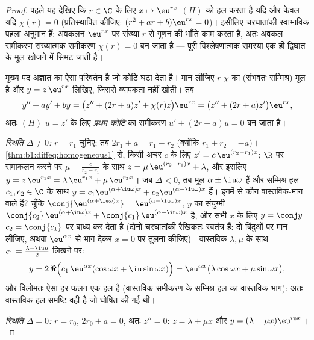 \begin{proof}
पहले यह देखिए कि $r \in \C$ के लिए $x \mapsto \eu^{rx}$ $(H)$ को हल करता है
यदि और केवल यदि $\chi(r) = 0$ (प्रतिस्थापित कीजिए: $(r^2 + ar + b)\eu^{rx} =
0$)। इसीलिए चरघातांकी स्वाभाविक पहला अनुमान हैं: अवकलन $\eu^{rx}$ पर संख्या
$r$ से गुणन की भाँति काम करता है, अतः अवकल समीकरण संख्यात्मक समीकरण $\chi(r)
= 0$ बन जाता है --- पूरी विश्लेषणात्मक समस्या एक ही द्विघात के मूल खोजने में
सिमट जाती है।

मुख्य पद अज्ञात का ऐसा परिवर्तन है जो कोटि घटा देता है। मान लीजिए $r$ $\chi$
का (संभवतः सम्मिश्र) मूल है और $y = z\, \eu^{rx}$ लिखिए, जिससे व्यापकता नहीं
खोती। तब
\[
y'' + ay' + by
= \bigl(z'' + (2r + a) z' + \chi(r) z\bigr)\eu^{rx}
= \bigl(z'' + (2r + a) z'\bigr)\eu^{rx},
\]
अतः $(H)$ $u = z'$ के लिए \emph{प्रथम कोटि} का समीकरण $u' + (2r + a) u = 0$
बन जाता है।

\emph{स्थिति $\Delta \neq 0$:} $r = r_1$ चुनिए; तब $2r_1 + a = r_1 - r_2$
(क्योंकि $r_1 + r_2 = -a$)। \cref{thm:b1:diffeq:homogeneous1} से, किसी अचर
$c$ के लिए $z' = c\,\eu^{(r_2 - r_1)x}$; $\R$ पर समाकलन करने पर $\mu =
\frac{c}{r_2 - r_1}$ के साथ $z = \mu\, \eu^{(r_2 - r_1)x} + \lambda$, और
इसलिए $y = z\, \eu^{r_1 x} = \lambda\,\eu^{r_1x} + \mu\,\eu^{r_2x}$। जब
$\Delta < 0$, तब मूल $\alpha \pm \iu\omega$ हैं और सम्मिश्र हल $c_1, c_2 \in
\C$ के साथ $y = c_1\eu^{(\alpha+\iu\omega)x} + c_2\eu^{(\alpha-\iu\omega)x}$
हैं। इनमें से कौन वास्तविक-मान वाले हैं? चूँकि
$\conj{\eu^{(\alpha+\iu\omega)x}} = \eu^{(\alpha-\iu\omega)x}$, $y$ का
संयुग्मी $\conj{c_2}\, \eu^{(\alpha+\iu\omega)x} +
\conj{c_1}\,\eu^{(\alpha-\iu\omega)x}$ है, और सभी $x$ के लिए $y = \conj y$
$c_2 = \conj{c_1}$ पर बाध्य कर देता है (दोनों चरघातांकी रैखिकतः स्वतंत्र
हैं: दो बिंदुओं पर मान लीजिए, अथवा $\eu^{\alpha x}$ से भाग देकर $x=0$ पर
तुलना कीजिए)। वास्तविक $\lambda, \mu$ के साथ $c_1 = \frac{\lambda -
\iu\mu}2$ लिखने पर:
\[
y = 2\,\Re\Bigl(c_1\,\eu^{\alpha x}(\cos\omega x +
\iu\sin\omega x)\Bigr)
= \eu^{\alpha x}\bigl(\lambda\cos\omega x + \mu\sin\omega
x\bigr),
\]
और विलोमतः ऐसा हर फलन एक हल है (वास्तविक समीकरण के सम्मिश्र हल का वास्तविक
भाग): अतः वास्तविक हल-समष्टि वही है जो घोषित की गई थी।

\emph{स्थिति $\Delta = 0$:} $r = r_0$, $2r_0 + a = 0$, अतः $z'' = 0$: $z =
\lambda + \mu x$ और $y = (\lambda + \mu x)\eu^{r_0 x}$।
\end{proof}

